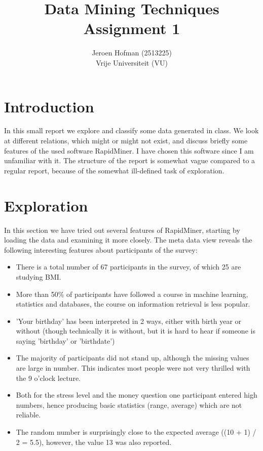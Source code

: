 \documentclass[11pt,a4paper,onecolumn]{article}
\author{Jeroen Hofman (2513225) \\
  [15pt] Vrije Universiteit (\textsc{VU})
}
\title{Data Mining Techniques \\
  Assignment 1
		}
\begin{document}
\maketitle
\captionsetup{width=0.8\textwidth}
\thispagestyle{empty}

\newpage

\section{Introduction}
In this small report we explore and classify some data generated in class. We look at different relations, which might or might not exist, and discuss briefly some features of the used software RapidMiner. I have chosen this software since I am unfamiliar with it. The structure of the report is somewhat vague compared to a regular report, because of the somewhat ill-defined task of exploration.

\section{Exploration}
In this section we have tried out several features of RapidMiner, starting by loading the data and examining it more closely. The meta data view reveals the following interesting features about participants of the survey:

\begin{itemize}
\item 
  There is a total number of 67 participants in the survey, of which 25 are studying BMI.
\item
  More than 50\% of participants have followed a course in machine learning, statistics and databases, the course on information retrieval is less popular.
\item
  'Your birthday' has been interpreted in 2 ways, either with birth year or without (though technically it is without, but it is hard to hear if someone is saying 'birthday' or 'birthdate')
\item
  The majority of participants did not stand up, although the missing values are large in number. This indicates most people were not very thrilled with the 9 o'clock lecture.
\item
  Both for the stress level and the money question one participant entered high numbers, hence producing basic statistics (range, average) which are not reliable.
\item
  The random number is surprisingly close to the expected average ((10 + 1) / 2 = 5.5), however, the value 13 was also reported.
\end{itemize}
\end{document}
